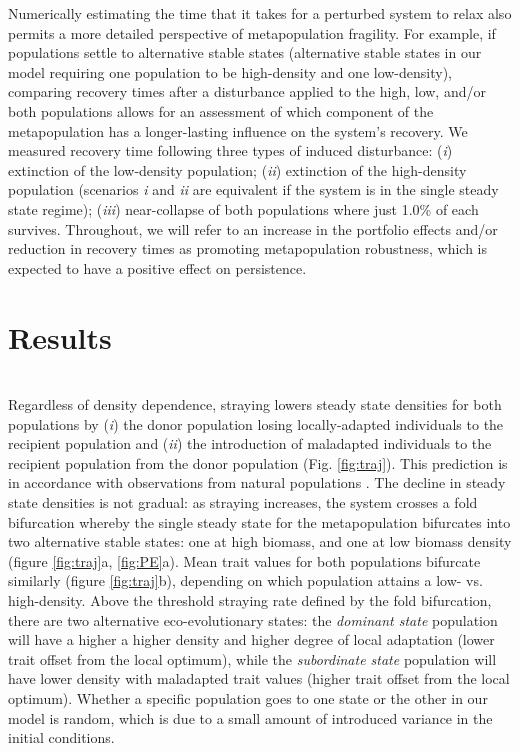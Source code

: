 \documentclass{revtex4}
\begin{document}
Numerically estimating the time that it takes for a perturbed system to relax also permits a more detailed perspective of metapopulation fragility.
For example, if populations settle to alternative stable states (alternative stable states in our model requiring one population to be high-density and one low-density), comparing recovery times after a disturbance applied to the high, low, and/or both populations allows for an assessment of which component of the metapopulation has a longer-lasting influence on the system's recovery.
We measured recovery time following three types of induced disturbance: (\emph{i}) extinction of the low-density population; (\emph{ii}) extinction of the high-density population (scenarios \emph{i} and \emph{ii} are equivalent if the system is in the single steady state regime); (\emph{iii}) near-collapse of both populations where just 1.0\% of each survives.
Throughout, we will refer to an increase in the portfolio effects and/or reduction in recovery times as promoting metapopulation robustness, which is expected to have a positive effect on persistence.
\\


\section{Results}





 \\
\noindent Regardless of density dependence, straying lowers steady state densities for both populations by (\emph{i}) the donor population losing locally-adapted individuals to the recipient population and (\emph{ii}) the introduction of maladapted individuals to the recipient population from the donor population (Fig. \ref{fig:traj}).
This prediction is in accordance with observations from natural populations \citep{Bett:2017ha}. %
The decline in steady state densities is not gradual: as straying increases, the system crosses a fold bifurcation whereby the single steady state for the metapopulation bifurcates into two alternative stable states: one at high biomass, and one at low biomass density (figure \ref{fig:traj}a, \ref{fig:PE}a).
Mean trait values for both populations bifurcate similarly (figure \ref{fig:traj}b), depending on which population attains a low- vs. high-density. 
Above the threshold straying rate defined by the fold bifurcation, there are two alternative eco-evolutionary states: the \emph{dominant state} population will have a higher a higher density and higher degree of local adaptation (lower trait offset from the local optimum), while the \emph{subordinate state} population will have lower density with maladapted trait values (higher trait offset from the local optimum). 
Whether a specific population goes to one state or the other in our model is random, which is due to a small amount of introduced variance in the initial conditions.
\end{document}
